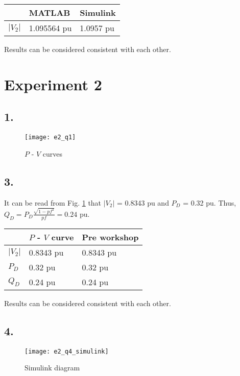 \documentclass{article}
\begin{document}
\begin{tabu} to \textwidth {XXX}
\toprule
&MATLAB &Simulink\\
\hline
$|V_2|$ &1.095564 pu &1.0957 pu\\
\bottomrule
\end{tabu}

\vspace{9pt}
Results can be considered consistent with each other.


\section*{Experiment 2}

\subsection*{1.}
\begin{figure}[H]
\centering
\texttt{[image: e2\_q1]}
\caption{$P$ - $V$ curves}
\label{e2_q1}
\end{figure}

\subsection*{3.}
It can be read from Fig. \ref{e2_q1} that $|V_2|$ = 0.8343 pu and $P_D$ = 0.32 pu. Thus, $Q_D = P_D \frac{\sqrt{1 - pf^2}}{pf} = 0.24$ pu.

\begin{tabu} to \textwidth {XXX}
\toprule
&$P$ - $V$ curve &Pre workshop\\
\hline
$|V_2|$ &0.8343 pu &0.8343 pu\\
\hline
$P_D$ &0.32 pu &0.32 pu\\
\hline
$Q_D$ &0.24 pu &0.24 pu\\
\bottomrule
\end{tabu}

\vspace{9pt}
Results can be considered consistent with each other.

\subsection*{4.}
\begin{figure}[H]
\centering
\texttt{[image: e2\_q4\_simulink]}
\caption{Simulink diagram}
\end{figure}
\end{document}
